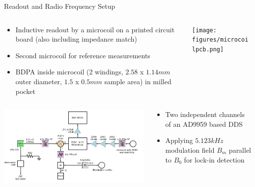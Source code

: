 \documentclass[final]{beamer}
\begin{document}
\begin{frame}[fragile]{}
\begin{columns}[T]
\begin{column}{.49\linewidth}
      \begin{block}{\Large Readout and Radio Frequency Setup}
        \begin{columns}
          \begin{column}{0.6\columnwidth}
            \begin{itemize}
              \item Inductive readout by a microcoil on a printed circuit
                board (also including impedance match)
              \item Second microcoil for reference measurements
              \item BDPA inside microcoil (2 windings, $2.58$ x $1.14mm$
                    outer diameter, $1.5$ x $0.5mm$ sample area) in milled pocket
            \end{itemize}
          \end{column}
          \begin{column}{0.4\columnwidth}

            \texttt{[image: figures/microcoilpcb.png]}
          \end{column}
        \end{columns}

        \begin{columns}
          \begin{column}{0.6\columnwidth}
            \includegraphics[width=\columnwidth]{figures/rfsetup.png}
          \end{column}
          \begin{column}{0.4\columnwidth}
            \begin{itemize}
              \item Two independent channels of an AD9959 based DDS
              \item Applying $5.123 kHz$ modulation field $B_m$ parallel to $B_0$
                for lock-in detection
            \end{itemize}
          \end{column}
        \end{columns}
      \end{block}
  

\end{column}
\end{columns}
\end{frame}
\end{document}
